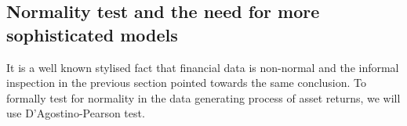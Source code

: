 \documentclass[11pt,a4paper,oneside]{article}
\begin{document}





\subsection{Normality test and the need for more sophisticated models}
\noindent It is a well known stylised fact that financial data is non-normal and the informal inspection in the previous section pointed towards the same conclusion. To formally test for normality in the data generating process of asset returns, we will use D’Agostino-Pearson test.    
\end{document}

